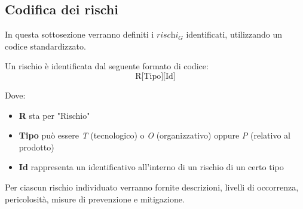 \subsection{Codifica dei rischi}
In questa sottosezione verranno definiti i $\textit{rischi}_G$ identificati, utilizzando un codice standardizzato.

Un rischio è identificata dal seguente formato di codice:
\[
\text{R[Tipo][Id]}
\]

Dove:
\begin{itemize}
    \item \textbf{R} sta per "Rischio"
    \item \textbf{Tipo} può essere \emph{T} (tecnologico) o \emph{O} (organizzativo) oppure \emph{P} (relativo al prodotto)
    \item \textbf{Id} rappresenta un identificativo all'interno di un rischio di un certo tipo
\end{itemize}

Per ciascun rischio individuato verranno fornite descrizioni, livelli di occorrenza, pericolosità, misure di prevenzione e mitigazione.
